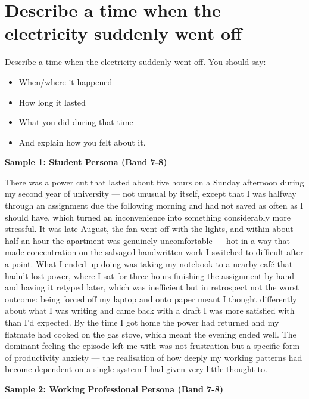 \section{Describe a time when the electricity suddenly went off}
\begin{ieltsprompt}
Describe a time when the electricity suddenly went off.
You should say:
\begin{itemize}[leftmargin=2em, itemsep=2pt]
\item When/where it happened
\item How long it lasted
\item What you did during that time
\item And explain how you felt about it.
\end{itemize}
\end{ieltsprompt}
\begin{ieltsanswer}
\textbf{Sample 1: Student Persona (Band 7-8)}

There was a power cut that lasted about five hours on a Sunday afternoon during my second year of university — not unusual by itself, except that I was halfway through an assignment due the following morning and had not saved as often as I should have, which turned an inconvenience into something considerably more stressful. It was late August, the fan went off with the lights, and within about half an hour the apartment was genuinely uncomfortable — hot in a way that made concentration on the salvaged handwritten work I switched to difficult after a point. What I ended up doing was taking my notebook to a nearby café that hadn't lost power, where I sat for three hours finishing the assignment by hand and having it retyped later, which was inefficient but in retrospect not the worst outcome: being forced off my laptop and onto paper meant I thought differently about what I was writing and came back with a draft I was more satisfied with than I'd expected. By the time I got home the power had returned and my flatmate had cooked on the gas stove, which meant the evening ended well. The dominant feeling the episode left me with was not frustration but a specific form of productivity anxiety — the realisation of how deeply my working patterns had become dependent on a single system I had given very little thought to.

\textbf{Sample 2: Working Professional Persona (Band 7-8)}


\end{ieltsanswer}
